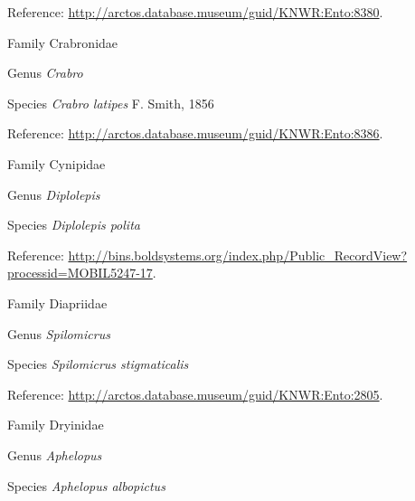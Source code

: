 \documentclass[9pt, article]{memoir}
\begin{document}
\begin{multicols}{2}
Reference: 
\url{http://arctos.database.museum/guid/KNWR:Ento:8380}.

\vspace{6pt}\noindent\hspace{24pt}Family Crabronidae


\vspace{6pt}\noindent\hspace{30pt}Genus \textit{Crabro}


\vspace{6pt}\noindent\hspace{36pt}Species \textit{Crabro latipes} F. Smith, 1856


Reference: 
\url{http://arctos.database.museum/guid/KNWR:Ento:8386}.

\vspace{6pt}\noindent\hspace{24pt}Family Cynipidae


\vspace{6pt}\noindent\hspace{30pt}Genus \textit{Diplolepis}


\vspace{6pt}\noindent\hspace{36pt}Species \textit{Diplolepis polita}


Reference: 
\url{http://bins.boldsystems.org/index.php/Public_RecordView?processid=MOBIL5247-17}.

\vspace{6pt}\noindent\hspace{24pt}Family Diapriidae


\vspace{6pt}\noindent\hspace{30pt}Genus \textit{Spilomicrus}


\vspace{6pt}\noindent\hspace{36pt}Species \textit{Spilomicrus stigmaticalis}


Reference: 
\url{http://arctos.database.museum/guid/KNWR:Ento:2805}.

\vspace{6pt}\noindent\hspace{24pt}Family Dryinidae


\vspace{6pt}\noindent\hspace{30pt}Genus \textit{Aphelopus}


\vspace{6pt}\noindent\hspace{36pt}Species \textit{Aphelopus albopictus}



\end{multicols}
\end{document}
